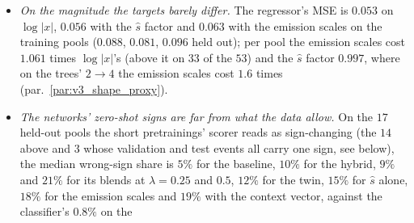 \documentclass[11pt]{article}
\newcommand{\abs}[1]{\left\lvert #1 \right\rvert}
\begin{document}
\begin{itemize}
    against $9.9\%$ and $15.8\%$ for one sign per pool on the same $44$ and $12$ pools; within a factor $10$ of zero it is $5.5\%$ and
    $8.6\%$ against $33.9\%$ and $15.4\%$. On $\log\hat s$ alone it does better than one sign per pool on $2$ of the
    $44$ and none of the $12$: the sign changes across the angles, not with the energy.
  \item \emph{On the magnitude the targets barely differ.} The regressor's MSE is $0.053$ on $\log\abs x$, $0.056$ with
    the $\hat s$ factor and $0.063$ with the emission scales on the training pools ($0.088$, $0.081$, $0.096$ held out);
    per pool the emission scales cost $1.061$ times $\log\abs x$'s (above it on $33$ of the $53$) and the $\hat s$ factor
    $0.997$, where on the trees' $2\to4$ the emission scales cost $1.6$ times (par.~\ref{par:v3_shape_proxy}).
  \item \emph{The networks' zero-shot signs are far from what the data allow.} On the $17$ held-out pools the short
    pretrainings' scorer reads as sign-changing (the $14$ above and $3$ whose validation and test events all carry one
    sign, see below), the median wrong-sign share is $5\%$ for the baseline, $10\%$ for
    the hybrid, $9\%$ and $21\%$ for its blends at $\lambda=0.25$ and $0.5$, $12\%$ for the twin, $15\%$ for $\hat s$
    alone, $18\%$ for the emission scales and $19\%$ with the context vector, against the classifier's $0.8\%$ on the

\end{itemize}
\end{document}
